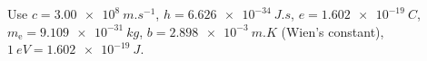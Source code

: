 \documentclass[12pt]{article}
\begin{document}
\begin{center}
  Use $c = \qty{3.00e8}{m.s^{-1}}$, $h = \qty{6.626e-34}{J.s}$, $e = \qty{1.602e-19}{C}$,
  $m_\mathrm{e} = \qty{9.109e-31}{kg}$, $b = \qty{2.898e-3}{m.K}$ (Wien's constant),
  $\qty{1}{eV} = \qty{1.602e-19}{J}$.
\end{center}
\end{document}

